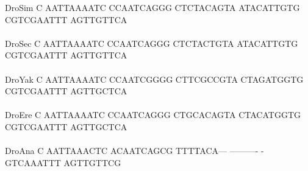 \documentclass[11pt,twoside,reqno,a4paper]{article}
\begin{document}
{DroSim	C	AATTAAAATC	CCAATCAGGG	CTCTACAGTA	ATACATTGTG	CGTCGAATTT	AGTTGTTCA\\
\hspace*{7\charwidth}\hspace*{1\charwidth}\hspace*{1\charwidth}\hspace*{1\charwidth}\hspace*{1\charwidth}\hspace*{1\charwidth}\hspace*{1\charwidth}\\
DroSec	C	AATTAAAATC	CCAATCAGGG	CTCTACTGTA	ATACATTGTG	CGTCGAATTT	AGTTGTTCA\\
\hspace*{7\charwidth}\hspace*{1\charwidth}\hspace*{1\charwidth}\hspace*{1\charwidth}\hspace*{1\charwidth}\hspace*{1\charwidth}\hspace*{1\charwidth}\\
DroYak	C	AATTAAAATC	CCAATCGGGG	CTTCGCCGTA	CTAGATGGTG	CGTCGAATTT	AGTTGCTCA\\
\hspace*{7\charwidth}\hspace*{1\charwidth}\hspace*{1\charwidth}\hspace*{1\charwidth}\hspace*{1\charwidth}\hspace*{1\charwidth}\hspace*{1\charwidth}\\
DroEre	C	AATTAAAATC	CCAATCAGGG	CTGCACAGTA	CTACATGGTG	CGTCGAATTT	AGTTGCTCA\\
\hspace*{7\charwidth}\hspace*{1\charwidth}\hspace*{1\charwidth}\hspace*{1\charwidth}\hspace*{1\charwidth}\hspace*{1\charwidth}\hspace*{1\charwidth}\\
DroAna	C	AATTAAACTC	ACAATCAGCG	TTTTACA---	----------	-GTCAAATTT	AGTTGTTCG\\
\hspace*{7\charwidth}\hspace*{1\charwidth}\hspace*{1\charwidth}\hspace*{1\charwidth}\hspace*{1\charwidth}\hspace*{1\charwidth}\hspace*{1\charwidth}\\
}
\end{document}
